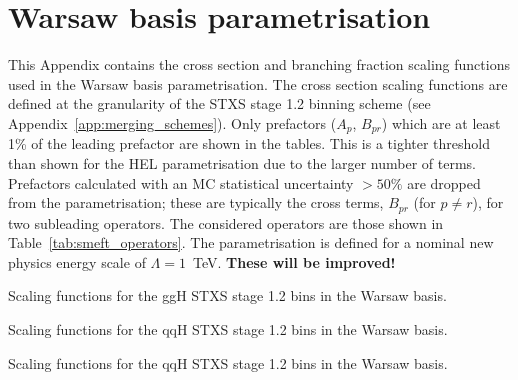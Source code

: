 \chapter{Warsaw basis parametrisation}\label{app:smeft_parametrisation}

This Appendix contains the cross section and branching fraction scaling functions used in the Warsaw basis parametrisation. The cross section scaling functions are defined at the granularity of the STXS stage 1.2 binning scheme (see Appendix~\ref{app:merging_schemes}). Only prefactors ($A_p$, $B_{pr}$) which are at least 1\% of the leading prefactor are shown in the tables. This is a tighter threshold than shown for the HEL parametrisation due to the larger number of terms. Prefactors calculated with an MC statistical uncertainty $>50\%$ are dropped from the parametrisation; these are typically the cross terms, $B_{pr}$ (for $p \neq r$), for two subleading operators. The considered operators are those shown in Table~\ref{tab:smeft_operators}. The parametrisation is defined for a nominal new physics energy scale of $\Lambda = 1$~TeV. \textbf{These will be improved!} 

\begin{table}[htb!]
  \centering
  \scriptsize
  \renewcommand{\arraystretch}{1.5}
  \setlength{\tabcolsep}{6pt}
  \caption[Warsaw: Scaling functions for the ggH STXS stage 1.2 bins]
  {
    Scaling functions for the ggH STXS stage 1.2 bins in the Warsaw basis.
  }
  \label{tab:warsaw_parametrisation_a}
  \hspace*{-2cm}
  
  \hspace*{-2cm}
\end{table}

\begin{table}[htb!]
  \centering
  \tiny
  \renewcommand{\arraystretch}{2}
  \setlength{\tabcolsep}{6pt}
  \caption[Warsaw: Scaling functions for the qqH STXS stage 1.2 bins]
  {
    Scaling functions for the qqH STXS stage 1.2 bins in the Warsaw basis.
  }
  \label{tab:warsaw_parametrisation_b}
  \hspace*{-2cm}
  
  \hspace*{-2cm}
\end{table}

\begin{table}[htb!]
  \centering
  \tiny
  \renewcommand{\arraystretch}{2}
  \setlength{\tabcolsep}{6pt}
  \caption[Warsaw: Scaling functions for the qqH STXS stage 1.2 bins]
  {
    Scaling functions for the qqH STXS stage 1.2 bins in the Warsaw basis.
  }
  \label{tab:warsaw_parametrisation_c}
  \hspace*{-2cm}
  
  \hspace*{-2cm}
\end{table}

